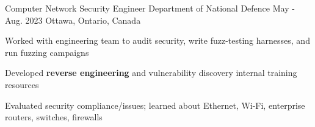 

\begin{cventries}

  \cventry
    {Computer Network Security Engineer} %
    {Department of National Defence} %
    {May - Aug. 2023} %
    {Ottawa, Ontario, Canada} %
    {
      \begin{cvitems} %
        \item{Worked with engineering team to audit security, write fuzz-testing harnesses, and run fuzzing campaigns}
        \item{Developed \textbf{reverse engineering} and vulnerability discovery internal training resources}
        \item{Evaluated security compliance/issues; learned about Ethernet, Wi-Fi, enterprise routers, switches, firewalls}
      \end{cvitems}
    }


\end{cventries}
